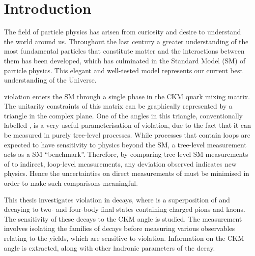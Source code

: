 %


\chapter{\label{ch:1-intro}Introduction} 

The field of particle physics has arisen from curiosity and desire to understand the world around us. Throughout the last century a greater understanding of the most fundamental particles that constitute matter and the interactions between them has been developed, which has culminated in the Standard Model (SM) of particle physics. This elegant and well-tested model represents our current best understanding of the Universe.

\CP violation enters the SM through a single phase in the CKM quark mixing matrix. The unitarity constraints of this matrix can be graphically represented by a triangle in the complex plane. One of the angles in this triangle, conventionally labelled \Pgamma, is a very useful parameterisation of \CP violation, due to the fact that it can be measured in purely tree-level processes. While processes that contain loops are expected to have sensitivity to physics beyond the SM, a tree-level measurement acts as a SM ``benchmark''. Therefore, by comparing tree-level SM measurements of \Pgamma to indirect, loop-level measurements, any deviation observed indicates new physics. Hence the uncertainties on direct measurements of \Pgamma must be minimised in order to make such comparisons meaningful.

This thesis investigates \CP violation in \btodkst decays, where \D is a superposition of \Dz and \Dzb decaying to two- and four-body final states containing charged pions and kaons. The sensitivity of these decays to the CKM angle \Pgamma is studied. The measurement involves isolating the \btodkst families of decays before measuring various observables relating to the yields, which are sensitive to \CP violation. Information on the CKM angle \Pgamma is extracted, along with other hadronic parameters of the decay.

